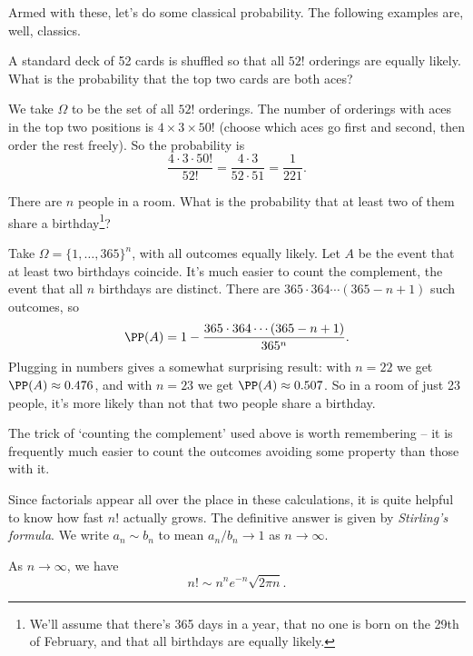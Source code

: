 Armed with these, let's do some classical probability. The following examples are, well, classics.

\begin{example}
	A standard deck of 52 cards is shuffled so that all $52!$ orderings are equally likely. What is the probability that the top two cards are both aces?

	We take $\Omega$ to be the set of all $52!$ orderings. The number of orderings with aces in the top two positions is $4 \times 3 \times 50!$ (choose which aces go first and second, then order the rest freely). So the probability is
	$$
	\frac{4 \cdot 3 \cdot 50!}{52!} = \frac{4 \cdot 3}{52 \cdot 51} = \frac{1}{221}.
	$$
\end{example}

\begin{example}
	There are $n$ people in a room. What is the probability that at least two of them share a birthday\footnote{We'll assume that there's 365 days in a year, that no one is born on the 29th of February, and that all birthdays are equally likely.}?

	Take $\Omega = \{1, \dots, 365\}^n$, with all outcomes equally likely. Let $A$ be the event that at least two birthdays coincide. It's much easier to count the complement, the event that all $n$ birthdays are distinct. There are $365 \cdot 364 \cdots (365 - n + 1)$ such outcomes, so
	$$
	\PP(A) = 1 - \frac{365 \cdot 364 \cdots (365 - n + 1)}{365^n}.
	$$
	Plugging in numbers gives a somewhat surprising result: with $n = 22$ we get $\PP(A) \approx 0.476$, and with $n = 23$ we get $\PP(A) \approx 0.507$. So in a room of just 23 people, it's more likely than not that two people share a birthday.
\end{example}

The trick of `counting the complement' used above is worth remembering -- it is frequently much easier to count the outcomes avoiding some property than those with it.

Since factorials appear all over the place in these calculations, it is quite helpful to know how fast $n!$ actually grows. The definitive answer is given by \emph{Stirling's formula}. We write $a_n \sim b_n$ to mean $a_n / b_n \rightarrow 1$ as $n \rightarrow \infty$.

\begin{theorem}
	As $n \rightarrow \infty$, we have
	$$
	n! \sim n^n e^{-n} \sqrt{2 \pi n}.
	$$
\end{theorem}

